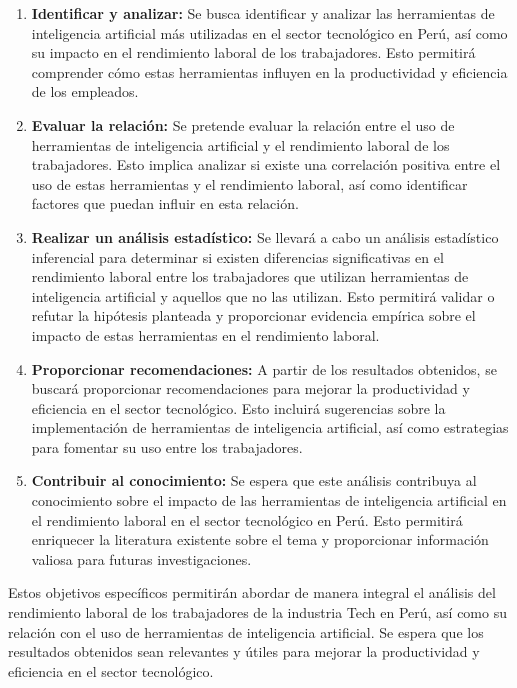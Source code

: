   \begin{enumerate}
    \item \textbf{Identificar y analizar:} Se busca identificar y analizar las herramientas de inteligencia artificial más utilizadas en el sector tecnológico en Perú, así como su impacto en el rendimiento laboral de los trabajadores. Esto permitirá comprender cómo estas herramientas influyen en la productividad y eficiencia de los empleados.
    \item \textbf{Evaluar la relación:} Se pretende evaluar la relación entre el uso de herramientas de inteligencia artificial y el rendimiento laboral de los trabajadores. Esto implica analizar si existe una correlación positiva entre el uso de estas herramientas y el rendimiento laboral, así como identificar factores que puedan influir en esta relación.
    \item \textbf{Realizar un análisis estadístico:} Se llevará a cabo un análisis estadístico inferencial para determinar si existen diferencias significativas en el rendimiento laboral entre los trabajadores que utilizan herramientas de inteligencia artificial y aquellos que no las utilizan. Esto permitirá validar o refutar la hipótesis planteada y proporcionar evidencia empírica sobre el impacto de estas herramientas en el rendimiento laboral.
    \item \textbf{Proporcionar recomendaciones:} A partir de los resultados obtenidos, se buscará proporcionar recomendaciones para mejorar la productividad y eficiencia en el sector tecnológico. Esto incluirá sugerencias sobre la implementación de herramientas de inteligencia artificial, así como estrategias para fomentar su uso entre los trabajadores.
    \item \textbf{Contribuir al conocimiento:} Se espera que este análisis contribuya al conocimiento sobre el impacto de las herramientas de inteligencia artificial en el rendimiento laboral en el sector tecnológico en Perú. Esto permitirá enriquecer la literatura existente sobre el tema y proporcionar información valiosa para futuras investigaciones.
  \end{enumerate}

  Estos objetivos específicos permitirán abordar de manera integral el análisis del rendimiento laboral de los trabajadores de la industria Tech en Perú, así como su relación con el uso de herramientas de inteligencia artificial. Se espera que los resultados obtenidos sean relevantes y útiles para mejorar la productividad y eficiencia en el sector tecnológico.
